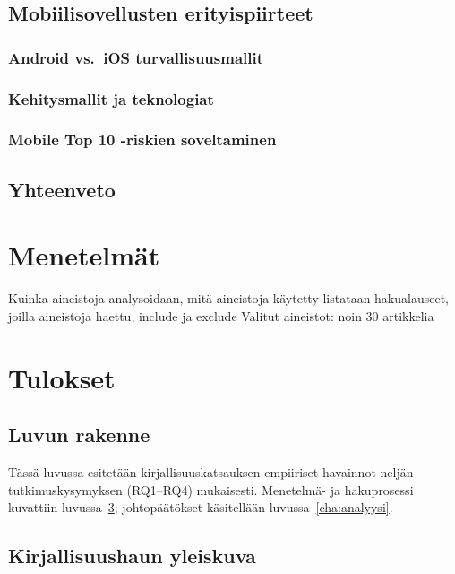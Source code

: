 \documentclass[bscthesis,finnish,oneside,biblatex]{uefcsthesis}
\begin{document}
\section{Mobiilisovellusten erityispiirteet}
\label{sec:mobile}
  \subsection{Android vs.\ iOS turvallisuusmallit}
  \subsection{Kehitysmallit ja teknologiat}
  \subsection{Mobile Top 10 -riskien soveltaminen}

\section{Yhteenveto}
\label{sec:teoria-yhteenveto}

\chapter{Menetelmät}
\label{cha:menetelmat}
Kuinka aineistoja analysoidaan, mitä aineistoja käytetty
listataan hakualauseet, joilla aineistoja haettu, include ja exclude
Valitut aineistot: noin 30 artikkelia

\chapter{Tulokset}
\label{cha:tulokset}

\section*{Luvun rakenne}
Tässä luvussa esitetään kirjallisuuskatsauksen empiiriset havainnot
neljän tutkimuskysymyksen (RQ1–RQ4) mukaisesti.  Menetelmä- ja
hakuprosessi kuvattiin luvussa~\ref{cha:menetelmat}; johtopäätökset
käsitellään luvussa~\ref{cha:analyysi}.

\section{Kirjallisuushaun yleiskuva}
\end{document}
